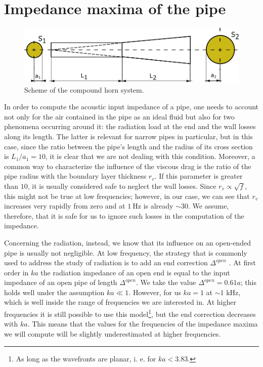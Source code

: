\documentclass[a4paper]{article}
\begin{document}
\section{Impedance maxima of the pipe}

\begin{figure}[h!]
	\centering
	\includegraphics[width=0.8\linewidth]{diagramma.pdf}
	\caption{Scheme of the compound horn system.}
	\label{fig:diag}
\end{figure}

In order to compute the acoustic input impedance of a pipe, one needs to account not only for the air contained in the pipe as an ideal fluid but also for two phenomena occurring around it: the radiation load at the end and the wall losses along its length. The latter is relevant for narrow pipes in particular, but in this case, since the ratio between the pipe's length and the radius of its cross section is $L_1/a_1 = 10$, it is clear that we are not dealing with this condition. Moreover, a common way to characterize the influence of the viscous drag is the ratio of the pipe radius with the boundary layer thickness $r_v$. If this parameter is greater than $10$, it is usually considered safe to neglect the wall losses. Since $r_v \propto \sqrt{f} $, this might not be true at low frequencies; however, in our case, we can see that $r_v$ increases very rapidly from zero and at $\SI{1}{\hertz}$ is already $ \sim 30 $. We assume, therefore, that it is safe for us to ignore such losses in the computation of the impedance. 

Concerning the radiation, instead, we know that its influence on an open-ended pipe is usually not negligible. At low frequency, the strategy that is commonly used to address the study of radiation is to add an end correction $\Delta^{open}$ . At first order in $ka$ the radiation impedance of an open end is equal to the input impedance of an open pipe of length $\Delta^{open}$. We take the value $\Delta^{open} = 0.61 a$; this holds well under the assumption $ka \ll 1 $. However, for us $ka = 1$ at $\sim 1$ kHz, which is well inside the range of frequencies we are interested in. At higher frequencies it is still possible to use this model\footnote{As long as the wavefronts are planar, i. e. for $ka<3.83$.}, but the end correction decreases with $ka$. This means that the values for the frequencies of the impedance maxima we will compute will be slightly underestimated at higher frequencies.
\end{document}
